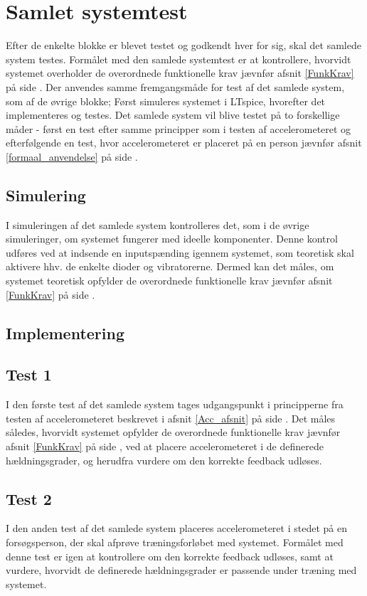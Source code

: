 \section{Samlet systemtest}
Efter de enkelte blokke er blevet testet og godkendt hver for sig, skal det samlede system testes. Formålet med den samlede systemtest er at kontrollere, hvorvidt systemet overholder de overordnede funktionelle krav jævnfør afsnit \ref{FunkKrav} på side \pageref{FunkKrav}. Der anvendes samme fremgangsmåde for test af det samlede system, som af de øvrige blokke; Først simuleres systemet i LTspice, hvorefter det implementeres og testes. Det samlede system vil blive testet på to forskellige måder - først en test efter samme principper som i testen af accelerometeret og efterfølgende en test, hvor accelerometeret er placeret på en person jævnfør afsnit \ref{formaal_anvendelse} på side \pageref{formaal_anvendelse}.

\subsection{Simulering}
I simuleringen af det samlede system kontrolleres det, som i de øvrige simuleringer, om systemet fungerer med ideelle komponenter. Denne kontrol udføres ved at indsende en inputspænding igennem systemet, som teoretisk skal aktivere hhv. de enkelte dioder og vibratorerne. Dermed kan det måles, om systemet teoretisk opfylder de overordnede funktionelle krav jævnfør afsnit \ref{FunkKrav} på side \pageref{FunkKrav}.  

\subsection{Implementering}

\subsection{Test 1}
I den første test af det samlede system tages udgangspunkt i principperne fra testen af accelerometeret beskrevet i afsnit \ref{Acc_afsnit} på side \pageref{Acc_afsnit}. Det måles således, hvorvidt systemet opfylder de overordnede funktionelle krav jævnfør afsnit \ref{FunkKrav} på side \pageref{FunkKrav}, ved at placere accelerometeret i de definerede hældningsgrader, og herudfra vurdere om den korrekte feedback udløses.  

\subsection{Test 2}
I den anden test af det samlede system placeres accelerometeret i stedet på en forsøgsperson, der skal afprøve træningsforløbet med systemet. Formålet med denne test er igen at kontrollere om den korrekte feedback udløses, samt at vurdere, hvorvidt de definerede hældningsgrader er passende under træning med systemet. 
 